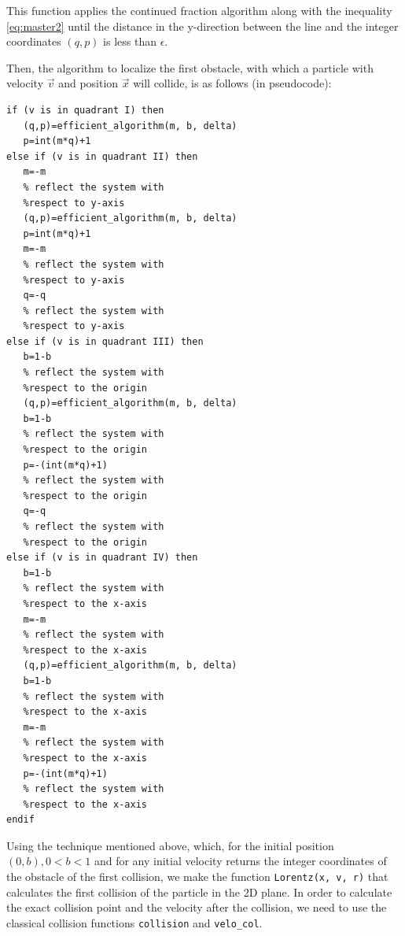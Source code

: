 \documentclass[pre,amsmath,amssymb, twocolumn, showpacs]{revtex4-1}
\begin{document}
This function applies the continued fraction algorithm along with the inequality \ref{eq:master2} until the distance in the y-direction between the line and the integer coordinates $(q, p)$ is less than $\epsilon$. 

Then, the algorithm to localize the first obstacle, with which a particle with velocity $\vec{v}$ and position $\vec{x}$ will collide, is as follows (in pseudocode): 

\begin{verbatim}
if (v is in quadrant I) then     
   (q,p)=efficient_algorithm(m, b, delta)
   p=int(m*q)+1
else if (v is in quadrant II) then
   m=-m                               
   % reflect the system with 
   %respect to y-axis 
   (q,p)=efficient_algorithm(m, b, delta)
   p=int(m*q)+1
   m=-m                                
   % reflect the system with 
   %respect to y-axis
   q=-q                                
   % reflect the system with 
   %respect to y-axis
else if (v is in quadrant III) then
   b=1-b                              
   % reflect the system with 
   %respect to the origin
   (q,p)=efficient_algorithm(m, b, delta)
   b=1-b                              
   % reflect the system with 
   %respect to the origin
   p=-(int(m*q)+1)                               
   % reflect the system with 
   %respect to the origin
   q=-q                               
   % reflect the system with 
   %respect to the origin
else if (v is in quadrant IV) then
   b=1-b                              
   % reflect the system with 
   %respect to the x-axis
   m=-m                               
   % reflect the system with 
   %respect to the x-axis
   (q,p)=efficient_algorithm(m, b, delta)             
   b=1-b                              
   % reflect the system with 
   %respect to the x-axis
   m=-m                               
   % reflect the system with 
   %respect to the x-axis
   p=-(int(m*q)+1)                               
   % reflect the system with 
   %respect to the x-axis
endif
\end{verbatim}

Using the technique mentioned above, which, for the initial position $(0, b), 0 < b < 1$ and for any initial velocity returns the integer coordinates of the obstacle of the first collision, we make the function \texttt{Lorentz(x, v, r)} that calculates the first collision of the particle in the 2D plane. In order to calculate the exact collision point and the velocity after the collision, we need to use the classical collision functions \texttt{collision} and \texttt{velo\_col}.
\end{document}
